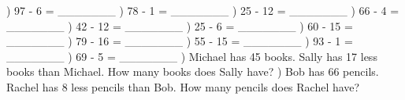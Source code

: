 \documentclass{article}%
\begin{document}
\newline%
\newline%
) 97 {-} 6 = \_\_\_\_\_\_\_%
\newline%
\newline%
) 78 {-} 1 = \_\_\_\_\_\_\_%
\newline%
\newline%
) 25 {-} 12 = \_\_\_\_\_\_\_%
\newline%
\newline%
) 66 {-} 4 = \_\_\_\_\_\_\_%
\newline%
\newline%
) 42 {-} 12 = \_\_\_\_\_\_\_%
\newline%
\newline%
) 25 {-} 6 = \_\_\_\_\_\_\_%
\newline%
\newline%
) 60 {-} 15 = \_\_\_\_\_\_\_%
\newline%
\newline%
) 79 {-} 16 = \_\_\_\_\_\_\_%
\newline%
\newline%
) 55 {-} 15 = \_\_\_\_\_\_\_%
\newline%
\newline%
) 93 {-} 1 = \_\_\_\_\_\_\_%
\newline%
\newline%
) 69 {-} 5 = \_\_\_\_\_\_\_%
\newline%
\newline%
) Michael has 45 books. Sally has 17 less books than Michael. How many books does Sally have?%
\newline%
\newline%
) Bob has 66 pencils. Rachel has 8 less pencils than Bob. How many pencils does Rachel have?%
\newline%
\newline%
\newline%
\end{document}
